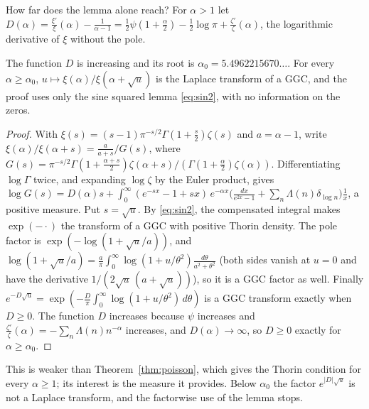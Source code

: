 How far does the lemma alone reach? For $\alpha>1$ let $D(\alpha)=\frac{\xi'}\xi(\alpha)-\frac1{\alpha-1}=\frac12\psi(1+\frac\alpha2)-\frac12\log\pi+\frac{\zeta'}\zeta(\alpha)$, the logarithmic derivative of $\xi$ without the pole.

\begin{proposition}\label{tx:prop:alpha0}
The function $D$ is increasing and its root is $\alpha_0=5.4962215670\ldots$. For every $\alpha\ge\alpha_0$, $u\mapsto\xi(\alpha)/\xi(\alpha+\sqrt u)$ is the Laplace transform of a GGC, and the proof uses only the sine squared lemma \eqref{eq:sin2}, with no information on the zeros.
\end{proposition}

\begin{proof}
With $\xi(s)=(s-1)\pi^{-s/2}\Gamma(1+\frac s2)\zeta(s)$ and $a=\alpha-1$, write $\xi(\alpha)/\xi(\alpha+s)=\frac a{a+s}/G(s)$, where $G(s)=\pi^{-s/2}\Gamma(1+\frac{\alpha+s}2)\zeta(\alpha+s)/(\Gamma(1+\frac\alpha2)\zeta(\alpha))$. Differentiating $\log\Gamma$ twice, and expanding $\log\zeta$ by the Euler product, gives $\log G(s)=D(\alpha)s+\int_0^\infty(e^{-sx}-1+sx)\,e^{-\alpha x}\big(\frac{dx}{e^{2x}-1}+\sum_n\Lambda(n)\delta_{\log n}\big)\frac1x$, a positive measure. Put $s=\sqrt u$. By \eqref{eq:sin2}, the compensated integral makes $\exp(-\cdot)$ the transform of a GGC with positive Thorin density. The pole factor is $\exp(-\log(1+\sqrt u/a))$, and $\log(1+\sqrt u/a)=\frac a\pi\int_0^\infty\log(1+u/\theta^2)\frac{d\theta}{a^2+\theta^2}$ (both sides vanish at $u=0$ and have the derivative $1/(2\sqrt u\,(a+\sqrt u))$), so it is a GGC factor as well. Finally $e^{-D\sqrt u}=\exp(-\frac D\pi\int_0^\infty\log(1+u/\theta^2)\,d\theta)$ is a GGC transform exactly when $D\ge0$. The function $D$ increases because $\psi$ increases and $\frac{\zeta'}\zeta(\alpha)=-\sum_n\Lambda(n)n^{-\alpha}$ increases, and $D(\alpha)\to\infty$, so $D\ge0$ exactly for $\alpha\ge\alpha_0$.
\end{proof}

This is weaker than Theorem~\ref{thm:poisson}, which gives the Thorin condition for every $\alpha\ge1$; its interest is the measure it provides. Below $\alpha_0$ the factor $e^{|D|\sqrt u}$ is not a Laplace transform, and the factorwise use of the lemma stops.


